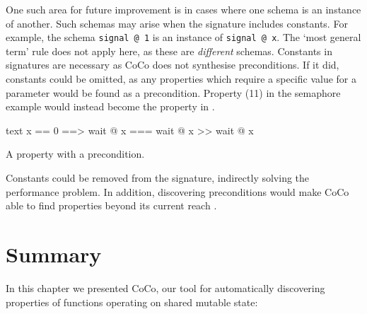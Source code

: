 One such area for future improvement is in cases where one schema is
an instance of another.  Such schemas may arise when the signature
includes constants.  For example, the schema \verb|signal @ 1| is an
instance of \verb|signal @ x|.  The `most general term' rule does not
apply here, as these are \emph{different} schemas.  Constants in
signatures are necessary as CoCo does not synthesise preconditions.
If it did, constants could be omitted, as any properties which require
a specific value for a parameter would be found as a precondition.
Property (11) in the semaphore example would instead become the
property in .

\begin{listing}
\centering
\begin{cminted}{text}
x == 0  ==>  wait @ x  ===  wait @ x >> wait @ x
\end{cminted}
\caption{A property with a precondition.}\label{lst:precondition}
\end{listing}

Constants could be removed from the signature, indirectly solving the
performance problem.  In addition, discovering preconditions would
make CoCo able to find properties beyond its current
reach \parencite{braquehais2017}.

\section{Summary}

In this chapter we presented CoCo, our tool for automatically
discovering properties of functions operating on shared mutable state:

